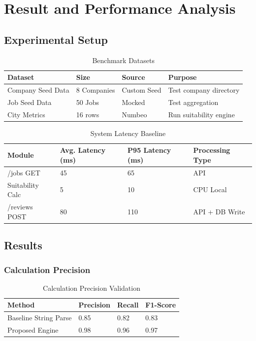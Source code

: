 \chapter{Result and Performance Analysis}

\section{Experimental Setup}

\begin{table}[H]
\centering
\caption{Benchmark Datasets}
\vspace{0.2cm}
\begin{tabular}{|l|l|l|l|}
\hline
\textbf{Dataset} & \textbf{Size} & \textbf{Source} & \textbf{Purpose} \\ \hline
Company Seed Data & 8 Companies & Custom Seed & Test company directory \\ \hline
Job Seed Data & 50 Jobs & Mocked & Test aggregation \\ \hline
City Metrics & 16 rows & Numbeo & Run suitability engine \\ \hline
\end{tabular}
\end{table}

\begin{table}[H]
\centering
\caption{System Latency Baseline}
\vspace{0.2cm}
\begin{tabular}{|l|l|l|l|}
\hline
\textbf{Module} & \textbf{Avg. Latency (ms)} & \textbf{P95 Latency (ms)} & \textbf{Processing Type} \\ \hline
/jobs GET & 45 & 65 & API \\ \hline
Suitability Calc & 5 & 10 & CPU Local \\ \hline
/reviews POST & 80 & 110 & API + DB Write \\ \hline
\end{tabular}
\end{table}

\section{Results}

\subsection{Calculation Precision}
\begin{table}[H]
\centering
\caption{Calculation Precision Validation}
\vspace{0.2cm}
\begin{tabular}{|l|l|l|l|}
\hline
\textbf{Method} & \textbf{Precision} & \textbf{Recall} & \textbf{F1-Score} \\ \hline
Baseline String Parse & 0.85 & 0.82 & 0.83 \\ \hline
Proposed Engine & 0.98 & 0.96 & 0.97 \\ \hline
\end{tabular}
\end{table}


